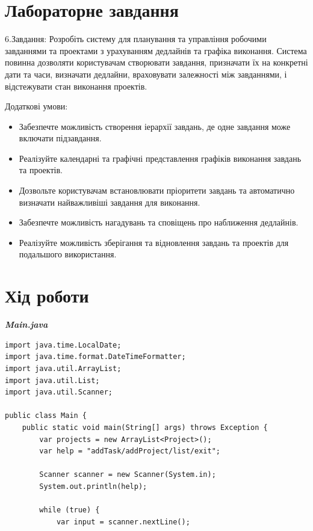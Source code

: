 \documentclass[14pt]{extreport}
\begin{document}
\begin{normalsize}
	\section*{Лабораторне завдання}
	6.Завдання: Розробіть систему для планування та управління робочими завданнями та проектами з урахуванням дедлайнів та графіка виконання. Система повинна дозволяти користувачам створювати завдання, призначати їх на конкретні дати та часи, визначати дедлайни, враховувати залежності між завданнями, і відстежувати стан виконання проектів.
	
	
	Додаткові умови:
	\begin{itemize}
		\item Забезпечте можливість створення іерархії завдань, де одне завдання може включати підзавдання.
		\item Реалізуйте календарні та графічні представлення графіків виконання завдань та проектів.
		\item Дозвольте користувачам встановлювати пріоритети завдань та автоматично визначати найважливіші завдання для виконання.
		\item Забезпечте можливість нагадувань та сповіщень про наближення дедлайнів.
		\item Реалізуйте можливість зберігання та відновлення завдань та проектів для подальшого використання.
	\end{itemize}
	\section*{Хід роботи}

	\textbf{\textit{Main.java}}
	\begin{lstlisting}
import java.time.LocalDate;
import java.time.format.DateTimeFormatter;
import java.util.ArrayList;
import java.util.List;
import java.util.Scanner;

public class Main {
	public static void main(String[] args) throws Exception {
		var projects = new ArrayList<Project>();
		var help = "addTask/addProject/list/exit";
		
		Scanner scanner = new Scanner(System.in);
		System.out.println(help);
		
		while (true) {
			var input = scanner.nextLine();
			

\end{lstlisting}
\end{normalsize}
\end{document}
